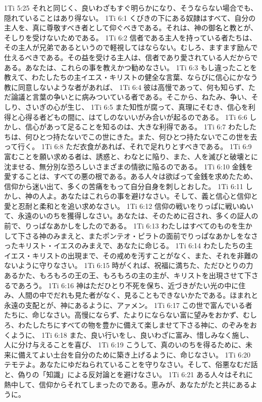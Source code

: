 1Ti 5:25  それと同じく、良いわざもすぐ明らかになり、そうならない場合でも、隠れていることはあり得ない。
1Ti 6:1  くびきの下にある奴隷はすべて、自分の主人を、真に尊敬すべき者として仰ぐべきである。それは、神の御名と教とが、そしりを受けないためである。
1Ti 6:2  信者である主人を持っている者たちは、その主人が兄弟であるというので軽視してはならない。むしろ、ますます励んで仕えるべきである。その益を受ける主人は、信者であり愛されている人だからである。あなたは、これらの事を教えかつ勧めなさい。
1Ti 6:3  もし違ったことを教えて、わたしたちの主イエス・キリストの健全な言葉、ならびに信心にかなう教に同意しないような者があれば、
1Ti 6:4  彼は高慢であって、何も知らず、ただ論議と言葉の争いとに病みついている者である。そこから、ねたみ、争い、そしり、さいぎの心が生じ、
1Ti 6:5  また知性が腐って、真理にそむき、信心を利得と心得る者どもの間に、はてしのないいがみ合いが起るのである。
1Ti 6:6  しかし、信心があって足ることを知るのは、大きな利得である。
1Ti 6:7  わたしたちは、何ひとつ持たないでこの世にきた。また、何ひとつ持たないでこの世を去って行く。
1Ti 6:8  ただ衣食があれば、それで足れりとすべきである。
1Ti 6:9  富むことを願い求める者は、誘惑と、わなとに陥り、また、人を滅びと破壊とに沈ませる、無分別な恐ろしいさまざまの情欲に陥るのである。
1Ti 6:10  金銭を愛することは、すべての悪の根である。ある人々は欲ばって金銭を求めたため、信仰から迷い出て、多くの苦痛をもって自分自身を刺しとおした。
1Ti 6:11  しかし、神の人よ。あなたはこれらの事を避けなさい。そして、義と信心と信仰と愛と忍耐と柔和とを追い求めなさい。
1Ti 6:12  信仰の戦いをりっぱに戦いぬいて、永遠のいのちを獲得しなさい。あなたは、そのために召され、多くの証人の前で、りっぱなあかしをしたのである。
1Ti 6:13  わたしはすべてのものを生かして下さる神のみまえと、またポンテオ・ピラトの面前でりっぱなあかしをなさったキリスト・イエスのみまえで、あなたに命じる。
1Ti 6:14  わたしたちの主イエス・キリストの出現まで、その戒めを汚すことがなく、また、それを非難のないように守りなさい。
1Ti 6:15  時がくれば、祝福に満ちた、ただひとりの力あるかた、もろもろの王の王、もろもろの主の主が、キリストを出現させて下さるであろう。
1Ti 6:16  神はただひとり不死を保ち、近づきがたい光の中に住み、人間の中でだれも見た者がなく、見ることもできないかたである。ほまれと永遠の支配とが、神にあるように、アァメン。
1Ti 6:17  この世で富んでいる者たちに、命じなさい。高慢にならず、たよりにならない富に望みをおかず、むしろ、わたしたちにすべての物を豊かに備えて楽しませて下さる神に、のぞみをおくように、
1Ti 6:18  また、良い行いをし、良いわざに富み、惜しみなく施し、人に分け与えることを喜び、
1Ti 6:19  こうして、真のいのちを得るために、未来に備えてよい土台を自分のために築き上げるように、命じなさい。
1Ti 6:20  テモテよ。あなたにゆだねられていることを守りなさい。そして、俗悪なむだ話と、偽りの「知識」による反対論とを避けなさい。
1Ti 6:21  ある人々はそれに熱中して、信仰からそれてしまったのである。恵みが、あなたがたと共にあるように。



